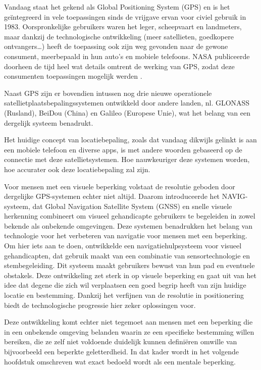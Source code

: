 Vandaag staat het gekend als Global Positioning System (GPS) en is het geïntegreerd in vele toepassingen sinds de vrijgave ervan voor civiel gebruik in 1983. Oorspronkelijke gebruikers waren het leger, scheepvaart en landmeters, maar dankzij de technologische ontwikkeling (meer satellieten, goedkopere ontvangers\ldots) heeft de toepassing ook zijn weg gevonden naar de gewone consument, meerbepaald in hun auto's en mobiele telefoons. NASA publiceerde doorheen de tijd heel wat details omtrent de werking van GPS, zodat deze consumenten toepassingen mogelijk werden \autocite{Zaidman2008}. 

Naast GPS zijn er bovendien intussen nog drie nieuwe operationele satellietplaatsbepalingssystemen ontwikkeld door andere landen, nl. GLONASS (Rusland), BeiDou (China) en Galileo (Europese Unie), wat het belang van een dergelijk systeem benadrukt. 

Het huidige concept van locatiebepaling, zoals dat vandaag dikwijls gelinkt is aan een mobiele telefoon en diverse apps, is met andere woorden gebaseerd op de connectie met deze satellietsystemen. Hoe nauwkeuriger deze systemen worden, hoe accurater ook deze locatiebepaling zal zijn. 

Voor mensen met een visuele beperking volstaat de resolutie geboden door dergelijke GPS-systemen echter niet altijd. Daarom introduceerde \textcite{Katz2010} het NAVIG-systeem, dat Global Navigation Satellite System (GNSS) en snelle visuele herkenning combineert om visueel gehandicapte gebruikers te begeleiden in zowel bekende als onbekende omgevingen. Deze systemen benadrukken het belang van technologie voor het verbeteren van navigatie voor mensen met een beperking. Om hier iets aan te doen, ontwikkelde  
\textcite{Lakde2015} een navigatiehulpsysteem voor visueel gehandicapten, dat gebruik maakt van een combinatie van sensortechnologie en stembegeleiding. Dit systeem maakt gebruikers bewust van hun pad en eventuele obstakels. Deze ontwikkeling zet sterk in op visuele beperking en gaat uit van het idee dat degene die zich wil verplaatsen een goed begrip heeft van zijn huidige locatie en bestemming. Dankzij het verfijnen van de resolutie in positionering biedt de technologische progressie hier zeker oplossingen voor. 

Deze ontwikkeling komt echter niet tegemoet aan mensen met een beperking die in een onbekende omgeving belanden waarin ze een specifieke bestemming willen bereiken, die ze zelf niet voldoende duidelijk kunnen definiëren omwille van bijvoorbeeld een beperkte geletterdheid. In dat kader wordt in het volgende hoofdstuk omschreven wat exact bedoeld wordt als een mentale beperking. 

